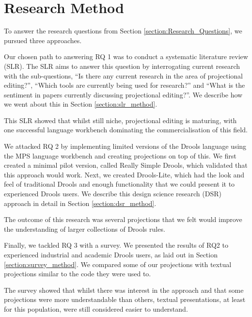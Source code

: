 \section{Research Method}
\label{section:Research_Method}

To answer the research questions from Section \ref{section:Research_Questions}, we pursued three approaches.

Our chosen path to answering RQ 1 was to conduct a systematic literature review (SLR).
The SLR aims to answer this question by interrogating current research with the sub-questions, ``Is there any current research in the area of projectional editing?'',  ``Which tools are currently being used for research?'' and ``What is the sentiment in papers currently discussing projectional editing?''.
We describe how we went about this in Section \ref{section:slr_method}. 

This SLR showed that whilst still niche, projectional editing is maturing, with one successful language workbench dominating the commercialisation of this field.

We attacked RQ 2 by implementing limited versions of the Drools language using the MPS language workbench and creating projections on top of this.
We first created a minimal pilot version, called Really Simple Drools, which validated that this approach would work.
Next, we created Drools-Lite, which had the look and feel of traditional Drools and enough functionality that we could present it to experienced Drools users.
We describe this design science research (DSR) approach in detail in Section \ref{section:dsr_method}.

The outcome of this research was several projections that we felt would improve the understanding of larger collections of Drools rules.

Finally, we tackled RQ 3 with a survey.
We presented the results of RQ2 to experienced industrial and academic Drools users, as laid out in Section \ref{section:survey_method}.
We compared some of our projections with textual projections similar to the code they were used to.

The survey showed that whilst there was interest in the approach and that some projections were more understandable than others, textual presentations, at least for this population, were still considered easier to understand.